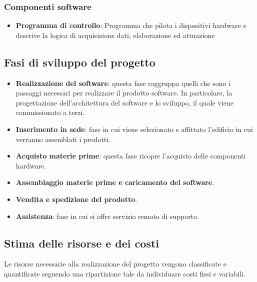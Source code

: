 \subsubsection{Componenti software}
\begin{itemize}
\item \textbf{Programma di controllo}: Programma che pilota i dispositivi
hardware e descrive la logica di acquisizione dati, elaborazione ed attuazione
\end{itemize}
\subsection{Fasi di sviluppo del progetto}
\begin{itemize}
\item \textbf{Realizzazione del software}: questa fase raggruppa quelli che sono i passaggi necessari per realizzare il prodotto software. In particolare, la progettazione dell'architettura del software e lo sviluppo, il quale viene commissionato a terzi.
\item \textbf{Inserimento in sede}: fase in cui viene selezionato e affittato l'edificio in cui verranno assemblati i prodotti.
\item \textbf{Acquisto materie prime}: questa fase ricopre l'acquisto delle componenti hardware.
\item \textbf{Assemblaggio materie prime e caricamento del software}.
\item \textbf{Vendita e spedizione del prodotto}.
\item \textbf{Assistenza}: fase in cui si offre servizio remoto di supporto.
\end{itemize}
\subsection{Stima delle risorse e dei costi}
Le risorse necessarie alla realizzazione del progetto vengono classificate e
quantificate seguendo una ripartizione tale da individuare costi fissi e
variabili.  
%
